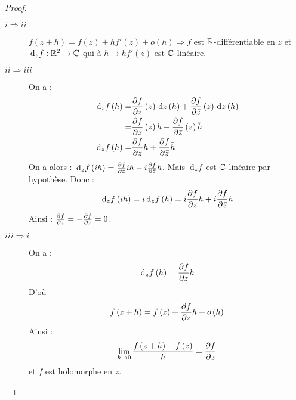 \documentclass{cours}
\begin{document}
\begin{proof}
	\begin{description}
		\item[$i \Rightarrow ii$] $f\left(z + h\right) = f\left(z\right) + hf'\left(z\right) + o\left(h\right) \Longrightarrow f$ est $\mathbb{R}$-différentiable en $z$ et ${\rm \, d}_{z}f : \mathbb{R}^{2}\to \mathbb{C}$ qui à $h \mapsto hf'\left(z\right)$ est $\mathbb{C}$-linéaire.
		\item[$ii \Rightarrow iii$] On a : 
			\begin{equation*}
				\begin{aligned}
					{\rm \, d}_{z}f\left(h\right) = & \frac{\partial f}{\partial z}\left(z\right){\rm \, d} z\left(h\right) + \frac{\partial f}{\partial \bar{z}}\left(z\right){\rm \, d} \bar{z}\left(h\right)\\
					= & \frac{\partial f}{\partial z}\left(z\right)h + \frac{\partial f}{\partial \bar{z}}\left(z\right)\bar{h}\\
					{\rm \, d}_{z}f\left(h\right) =& \frac{\partial f}{\partial z}h + \frac{\partial f}{\partial \bar{z}}\bar{h}
				\end{aligned}
			\end{equation*}
			On a alors : ${\rm \, d}_{z}f\left(ih\right) = \frac{\partial f}{\partial z}ih -i\frac{\partial f}{\partial \bar{z}}\bar{h}$. Mais ${\rm \, d}_{z}f$ est $\mathbb{C}$-linéaire par hypothèse. Donc : 
			\begin{equation*}
				{\rm \, d}_{z}f\left(ih\right) = i{\rm \, d}_{z}f\left(h\right) = i\frac{\partial f}{\partial z}h + i\frac{\partial f}{\partial \bar{z}}\bar{h}
			\end{equation*}
			Ainsi : $\frac{\partial f}{\partial \bar{z}} = - \frac{\partial f}{\partial \bar{z}} = 0$.
		\item[$iii \Rightarrow i$] On a : 
			\begin{equation*}
				{\rm \, d}_{z}f\left(h\right) = \frac{\partial f}{\partial z}h
			\end{equation*}
			D'où 
			\begin{equation*}
				f\left(z + h\right) = f\left(z\right) + \frac{\partial f}{\partial z}h + o\left(h\right)
			\end{equation*}
			Ainsi : 
			\begin{equation*}	
				\lim_{h \to 0}\frac{f\left(z + h\right) - f\left(z\right)}{h} = \frac{\partial f}{\partial z}
			\end{equation*}
			et $f$ est holomorphe en $z$. 
	\end{description}
\end{proof}
\end{document}

